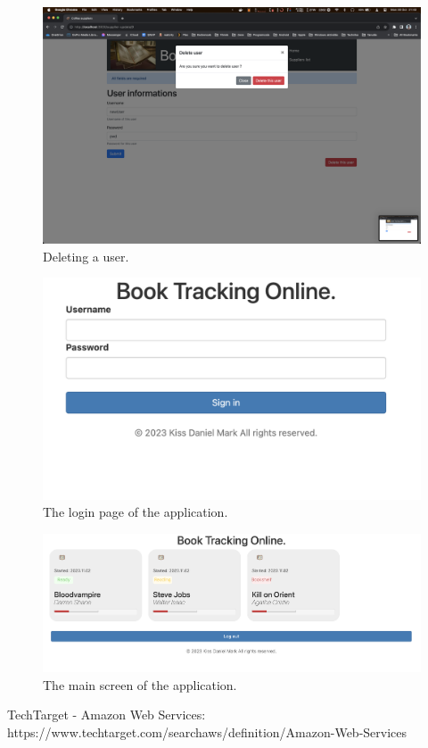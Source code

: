 \documentclass[11pt,a4paper,oneside]{report}
\begin{document}
\begin{figure}[!ht]
  \centering
  \includegraphics[scale=0.3]{admin_delete.png}
  \caption{Deleting a user.}
  \label{fig:TexnicCenter}
\end{figure}


\begin{figure}[!ht]
  \centering
  \includegraphics[scale=0.3]{frontend-login.png}
  \caption{The login page of the application.}
  \label{fig:TexnicCenter}
\end{figure}

\begin{figure}[!ht]
  \centering
  \includegraphics[scale=0.3]{frontend-main.png}
  \caption{The main screen of the application.}
  \label{fig:TexnicCenter}
\end{figure}

\begin{thebibliography}{9}
  TechTarget - Amazon Web Services: https://www.techtarget.com/searchaws/definition/Amazon-Web-Services

\end{thebibliography}
\end{document}
